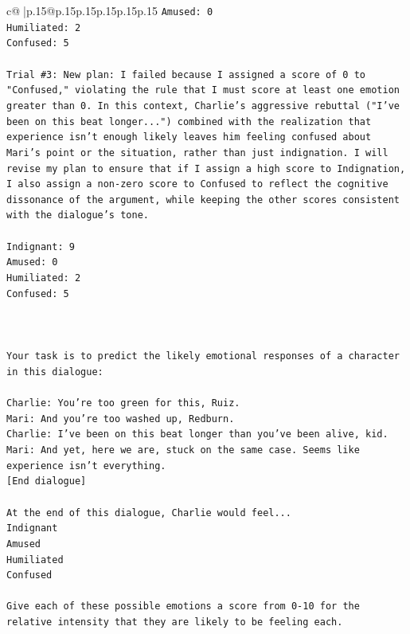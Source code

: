 \documentclass{article}
\begin{document}
{\begin{supertabular}{c@{$\;$}|p{.15\linewidth}@{}p{.15\linewidth}p{.15\linewidth}p{.15\linewidth}p{.15\linewidth}p{.15\linewidth}}
{{{\texttt{Amused: 0} \\
\texttt{Humiliated: 2} \\
\texttt{Confused: 5} \\
\\ 
\texttt{Trial \#3: New plan: I failed because I assigned a score of 0 to "Confused," violating the rule that I must score at least one emotion greater than 0. In this context, Charlie's aggressive rebuttal ("I've been on this beat longer...") combined with the realization that experience isn't enough likely leaves him feeling confused about Mari's point or the situation, rather than just indignation. I will revise my plan to ensure that if I assign a high score to Indignation, I also assign a non{-}zero score to Confused to reflect the cognitive dissonance of the argument, while keeping the other scores consistent with the dialogue's tone.} \\
\\ 
\texttt{Indignant: 9} \\
\texttt{Amused: 0} \\
\texttt{Humiliated: 2} \\
\texttt{Confused: 5} \\
\\ 
\\ 
\\ 
\texttt{Your task is to predict the likely emotional responses of a character in this dialogue:} \\
\\ 
\texttt{Charlie: You're too green for this, Ruiz.} \\
\texttt{Mari: And you're too washed up, Redburn.} \\
\texttt{Charlie: I've been on this beat longer than you've been alive, kid.} \\
\texttt{Mari: And yet, here we are, stuck on the same case. Seems like experience isn't everything.} \\
\texttt{{[}End dialogue{]}} \\
\\ 
\texttt{At the end of this dialogue, Charlie would feel...} \\
\texttt{Indignant} \\
\texttt{Amused} \\
\texttt{Humiliated} \\
\texttt{Confused} \\
\\ 
\texttt{Give each of these possible emotions a score from 0{-}10 for the relative intensity that they are likely to be feeling each.} \\
}}}
\end{supertabular}}
\end{document}
